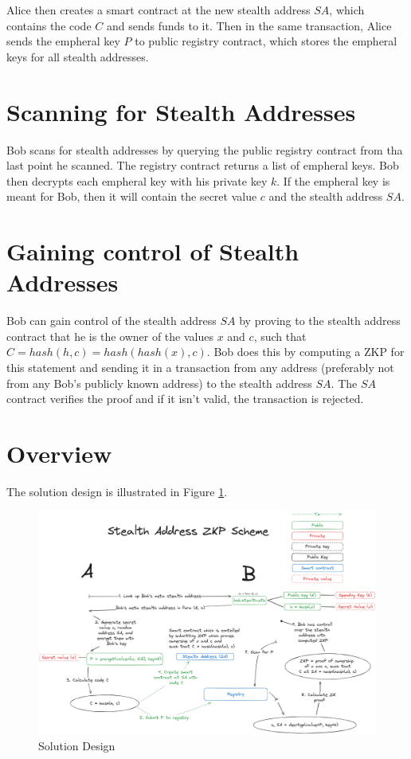 Alice then creates a smart contract at the new stealth address $SA$, which contains
the code $C$ and sends funds to it. Then in the same transaction, Alice sends
the empheral key $P$ to public registry contract, which stores the empheral
keys for all stealth addresses.

\section{Scanning for Stealth Addresses}

Bob scans for stealth addresses by querying the public registry contract
from tha last point he scanned. The registry contract returns a list of
empheral keys. Bob then decrypts each empheral key with his private key $k$.
If the empheral key is meant for Bob, then it will contain the secret value
$c$ and the stealth address $SA$.

\section{Gaining control of Stealth Addresses}

Bob can gain control of the stealth address $SA$ by proving to the stealth
address contract that he is the owner of the values $x$ and $c$, such that
$C = hash(h, c) = hash(hash(x), c)$. Bob does this by computing a ZKP for 
this statement and sending it in a transaction from any address (preferably
not from any Bob's publicly known address) to the stealth address $SA$. The
$SA$ contract verifies the proof and if it isn't valid, the transaction is
rejected.

\section{Overview}

The solution design is illustrated in Figure \ref{fig:solution}.

\begin{figure}[h]
    \centering
    \includegraphics[scale=0.15]{assets/images/solution.png}
    \caption{Solution Design}
    \label{fig:solution}
    \vspace{0.5cm}
\end{figure}

